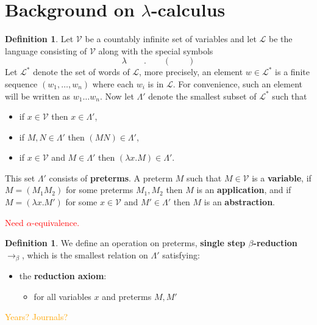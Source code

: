 \documentclass[12pt]{article}
\theoremstyle{plain}
\theoremstyle{definition}
\newtheorem{defn}[thm]{Definition} %
\newcommand{\scr}[1]{\mathscr{#1}}
\newcommand{\lto}{\longrightarrow}
\begin{document}
\section{Background on $\lambda$-calculus}
\label{App:lambda_calc}
\begin{defn}
    Let $\scr{V}$ be a countably infinite set of variables and let $\scr{L}$ be the language consisting of $\scr{V}$ along with the special symbols
    \begin{equation}
        \lambda\qquad . \qquad (\qquad )
    \end{equation}
    Let $\scr{L}^\ast$ denote the set of words of $\scr{L}$, more precisely, an element $w \in \scr{L}^\ast$ is a finite sequence $(w_1, \ldots, w_n)$ where each $w_i$ is in $\scr{L}$. For convenience, such an element will be written as $w_1 \ldots w_n$. Now let $\Lambda'$ denote the smallest subset of $\scr{L}^\ast$ such that
    \begin{itemize}
        \item if $x \in \scr{V}$ then $x \in \Lambda'$,
        \item if $M, N \in \Lambda'$ then $(MN) \in \Lambda'$,
        \item if $x \in \scr{V}$ and $M \in \Lambda'$ then $(\lambda x. M) \in \Lambda'$.
    \end{itemize}
    This set $\Lambda'$ consists of \textbf{preterms}. A preterm $M$ such that $M \in \scr{V}$ is a \textbf{variable}, if $M = (M_1 M_2)$ for some preterms $M_1, M_2$ then $M$ is an \textbf{application}, and if $M = (\lambda x. M')$ for some $x \in \scr{V}$ and $M' \in \Lambda'$ then $M$ is an \textbf{abstraction}.
\end{defn}
\textcolor{red}{Need $\alpha$-equivalence.}

\begin{defn}
    We define an operation on preterms, \textbf{single step $\beta$-reduction} $\lto_\beta$, which is the smallest relation on $\Lambda'$ satisfying:
    \begin{itemize}
        \item the \textbf{reduction axiom}:
        \begin{itemize}
            \item for all variables $x$ and preterms $M, M'$
        \end{itemize}
    \end{itemize}
\end{defn}

\textcolor{orange}{Years? Journals?}
\end{document}
